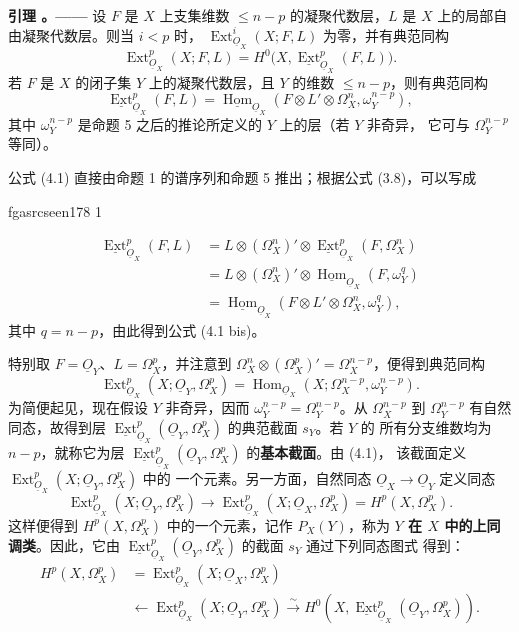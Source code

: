 \documentclass[12pt,twoside,openany]{book}
\numberwithin{equation}{section}
\newcommand{\fgaunitid}{unbound}
\newcommand{\src}[1]{%
  \phantomsection
  \hypertarget{src:\fgaunitid:#1}{}%
  \hypertarget{fga.\fgaunitid.p#1}{}%
  \ifcsname fgasrcseen#1\endcsname\else
    \expandafter\gdef\csname fgasrcseen#1\endcsname{1}%
    \hypertarget{src:#1}{}%
  \fi
  \marginpar{\raggedleft\footnotesize\sffamily #1}%
}
\newcommand{\Osh}{\underline{O}}
\newcommand{\Homsh}{\underline{\operatorname{Hom}}}
\newcommand{\Extsh}{\underline{\operatorname{Ext}}}
\newcommand{\zhterm}[1]{\textbf{#1}}
\theoremstyle{plain}
\theoremstyle{definition}
\theoremstyle{remark}
\newcommand{\result}[2]{%
  \par\medskip\noindent\textbf{#1%
  \if\relax\detokenize{#2}\relax\else\space#2\fi。——}\enspace
}
\begin{document}
\result{引理}{1} 设 $F$ 是 $X$ 上支集维数 $\leq n-p$ 的凝聚代数层，$L$
是 $X$ 上的局部自由凝聚代数层。则当 $i<p$ 时，
$\operatorname{Ext}_{\Osh_X}^{i}(X;F,L)$ 为零，并有典范同构
\begin{equation}\tag{4.1}
  \operatorname{Ext}_{\Osh_X}^{p}(X;F,L)
  =H^{0}\bigl(X,\Extsh_{\Osh_X}^{p}(F,L)\bigr).
\end{equation}
若 $F$ 是 $X$ 的闭子集 $Y$ 上的凝聚代数层，且 $Y$ 的维数
$\leq n-p$，则有典范同构
\begin{equation}\tag{4.1 bis}
  \Extsh_{\Osh_X}^{p}(F,L)
  =\Homsh_{\Osh_X}\!\left(
    F\otimes L'\otimes\Omega_X^{n},\omega_Y^{n-p}
  \right),
\end{equation}
其中 $\omega_Y^{n-p}$ 是命题 5 之后的推论所定义的 $Y$ 上的层（若 $Y$ 非奇异，
它可与 $\Omega_Y^{n-p}$ 等同）。

公式 (4.1) 直接由命题 1 的谱序列和命题 5 推出；根据公式 (3.8)，可以写成

\src{178}
\begin{align*}
\Extsh_{\Osh_X}^{p}(F,L)
&=L\otimes(\Omega_X^{n})'\otimes
  \Extsh_{\Osh_X}^{p}(F,\Omega_X^{n})\\
&=L\otimes(\Omega_X^{n})'\otimes
  \Homsh_{\Osh_X}(F,\omega_Y^{q})\\
&=\Homsh_{\Osh_X}\!\left(
  F\otimes L'\otimes\Omega_X^{n},\omega_Y^{q}\right),
\end{align*}
其中 $q=n-p$，由此得到公式 (4.1 bis)。

特别取 $F=\Osh_Y$、$L=\Omega_X^{p}$，并注意到
$\Omega_X^{n}\otimes(\Omega_X^{p})'=\Omega_X^{n-p}$，便得到典范同构
\begin{equation}\tag{4.2}
  \operatorname{Ext}_{\Osh_X}^{p}(X;\Osh_Y,\Omega_X^{p})
  =\operatorname{Hom}_{\Osh_X}
  (X;\Omega_X^{n-p},\omega_Y^{n-p}).
\end{equation}
为简便起见，现在假设 $Y$ 非奇异，因而
$\omega_Y^{n-p}=\Omega_Y^{n-p}$。从 $\Omega_X^{n-p}$ 到
$\Omega_Y^{n-p}$ 有自然同态，故得到层
$\Extsh_{\Osh_X}^{p}(\Osh_Y,\Omega_X^{p})$ 的典范截面 $s_Y$。若 $Y$ 的
所有分支维数均为 $n-p$，就称它为层
$\Extsh_{\Osh_X}^{p}(\Osh_Y,\Omega_X^{p})$ 的\zhterm{基本截面}。由 (4.1)，
该截面定义 $\operatorname{Ext}_{\Osh_X}^{p}(X;\Osh_Y,\Omega_X^{p})$ 中的
一个元素。另一方面，自然同态 $\Osh_X\longrightarrow\Osh_Y$ 定义同态
\[
  \operatorname{Ext}_{\Osh_X}^{p}(X;\Osh_Y,\Omega_X^{p})
  \longrightarrow
  \operatorname{Ext}_{\Osh_X}^{p}(X;\Osh_X,\Omega_X^{p})
  =H^{p}(X,\Omega_X^{p}).
\]
这样便得到 $H^{p}(X,\Omega_X^{p})$ 中的一个元素，记作 $P_X(Y)$，称为
\zhterm{$Y$ 在 $X$ 中的上同调类}。因此，它由
$\Extsh_{\Osh_X}^{p}(\Osh_Y,\Omega_X^{p})$ 的截面 $s_Y$ 通过下列同态图式
得到：
\begin{equation}\tag{4.3}
\begin{aligned}
H^{p}(X,\Omega_X^{p})
&=\operatorname{Ext}_{\Osh_X}^{p}(X;\Osh_X,\Omega_X^{p})\\
&\longleftarrow\operatorname{Ext}_{\Osh_X}^{p}(X;\Osh_Y,\Omega_X^{p})
\xrightarrow{\ \sim\ }
H^{0}\!\left(X,\Extsh_{\Osh_X}^{p}(\Osh_Y,\Omega_X^{p})\right).
\end{aligned}
\end{equation}
\end{document}
